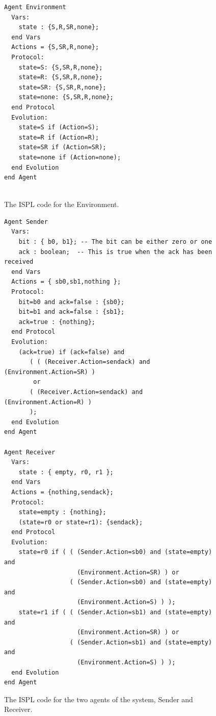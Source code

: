 \documentclass[11pt]{report}
\begin{document}
\begin{figure}
\begin{lstlisting}
Agent Environment
  Vars:
    state : {S,R,SR,none};
  end Vars
  Actions = {S,SR,R,none};
  Protocol:
    state=S: {S,SR,R,none};
    state=R: {S,SR,R,none};
    state=SR: {S,SR,R,none};
    state=none: {S,SR,R,none};
  end Protocol
  Evolution:
    state=S if (Action=S);
    state=R if (Action=R);
    state=SR if (Action=SR);
    state=none if (Action=none);
  end Evolution
end Agent


\end{lstlisting}
\caption{The ISPL code for the Environment.}
\end{figure}
\begin{figure}
\begin{lstlisting}
Agent Sender
  Vars:
    bit : { b0, b1}; -- The bit can be either zero or one
    ack : boolean;  -- This is true when the ack has been received
  end Vars
  Actions = { sb0,sb1,nothing };
  Protocol:
    bit=b0 and ack=false : {sb0};
    bit=b1 and ack=false : {sb1};
    ack=true : {nothing};
  end Protocol
  Evolution:
    (ack=true) if (ack=false) and 
       ( ( (Receiver.Action=sendack) and (Environment.Action=SR) ) 
        or
       ( (Receiver.Action=sendack) and (Environment.Action=R) )
       );
  end Evolution
end Agent

Agent Receiver
  Vars:
    state : { empty, r0, r1 };
  end Vars
  Actions = {nothing,sendack};
  Protocol:
    state=empty : {nothing};
    (state=r0 or state=r1): {sendack};
  end Protocol
  Evolution:
    state=r0 if ( ( (Sender.Action=sb0) and (state=empty) and 
                    (Environment.Action=SR) ) or 
                  ( (Sender.Action=sb0) and (state=empty) and 
                    (Environment.Action=S) ) );
    state=r1 if ( ( (Sender.Action=sb1) and (state=empty) and 
                    (Environment.Action=SR) ) or 
                  ( (Sender.Action=sb1) and (state=empty) and 
                    (Environment.Action=S) ) );
  end Evolution
end Agent
\end{lstlisting}
\caption{The ISPL code for the two agents of the system, Sender and Receiver.}
\end{figure}
\end{document}
